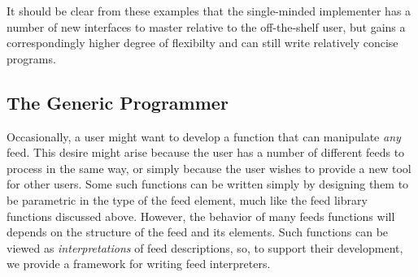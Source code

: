 It should be clear from these examples that the single-minded implementer
has a number of new interfaces to master relative to the off-the-shelf
user, but gains a correspondingly higher degree of flexibilty and can
still write relatively concise programs.


\subsection{The Generic Programmer}


Occasionally, a user might want to develop a function that can
manipulate {\it any} feed. This desire might arise because the user
has a number of different feeds to process in the same way, or simply
because the user wishes to provide a new tool for other \padsd{}
users. Some such functions can be written simply by designing them to
be parametric in the type of the feed element, much like the feed
library functions discussed above. However, the behavior of many feeds
functions will depends on the structure of the feed and its
elements. Such functions can be viewed as {\it interpretations} of
feed descriptions, so, to support their development, we provide a
framework for writing feed interpreters.


